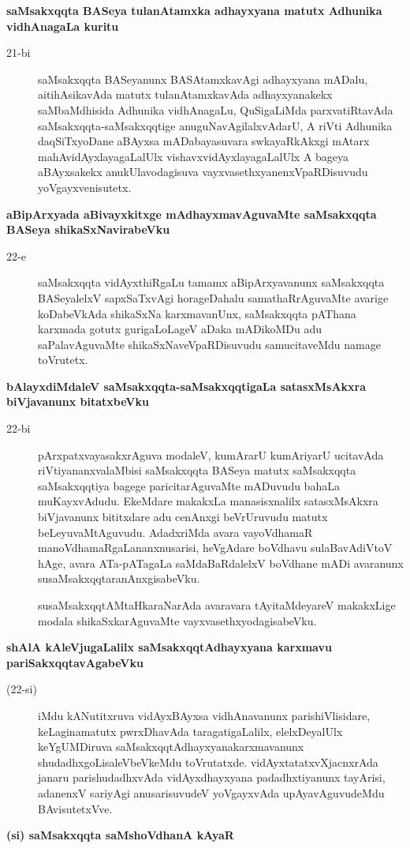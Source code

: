 {\bigskip
\noindent
{\large\bf saMsakxqqta BASeya tulanAtamxka adhayxyana matutx Adhunika vidhAnagaLa kuritu}}\label{page52}
\begin{description}
\item[21-bi] saMsakxqqta BASeyanunx BASAtamxkavAgi adhayxyana mADalu, aitihAsikavAda matutx tulanAtamxkavAda adhayxyanakekx saMbaMdhisida Adhunika vidhAnagaLu, QuSigaLiMda parxvatiRtavAda saMsakxqqta-saMsakxqqtige anuguNa\-vAgilalx\-vAdarU, A riVti Adhunika daqSiTx\-yoDane aBAyxsa mADa\-bayasu\-vara swkayaR\-kAkxgi mAtarx mahAvidAyxlayagaLalUlx vishavxvidAyxlayagaLalUlx A bageya aBAyx\-sakekx anu\-kUla\-voda\-gisuva vayxvasethxyanenxVpaRDisuvudu yoVgayxvenisutetx.
\end{description}
{\noindent
{\large\bf aBipArxyada aBivayxkitxge mAdhayxmavAguvaMte saMsakxqqta BASeya shikaSxNavirabeVku}}\label{page52a}
\begin{description}
\item[22-e] saMsakxqqta vidAyxthiRgaLu tamamx aBipArxyavanunx saMsakxqqta BASeyalelxV sapxSaTxvAgi hora\-geDa\-halu sama\-thaR\-rAgu\-vaMte avarige koDa\-beVkAda shikaSxNa karxma\-vanUnx, saMsakxqqta pAThana karxmada gotutx guri\-gaLo\-LageV aDaka mADi\-koMDu adu saPala\-vAgu\-vaMte shikaSxNa\-veVpaRDisu\-vudu samucita\-veMdu namage toVrutetx.
\end{description}
{\noindent
{\large\bf bAlayxdiMdaleV saMsakxqqta-saMsakxqqtigaLa satasxMsAkxra biVjavanunx bitatxbeVku}}\label{page53}
\begin{description}
\item[22-bi] pArxpatxvayasakxrAguva modaleV, kumArarU kumAriyarU ucitavAda riVti\-yananx\-va\-laMbisi saMsakxqqta BASeya matutx saMsakxqqta saMsakxqqtiya bagege paricitarAguvaMte mADuvudu bahaLa muKayxvAdudu. EkeMdare makakxLa manasisxnalilx satasxMsAkxra biVjavanunx bititxdare adu cenAnxgi beVrUru\-vudu matutx beLeyuvaMtAguvudu. AdadxriMda avara vayoVdhamaR manoV\-dhamaR\-gaLa\-nanxnu\-sarisi, heVgAdare boVdhavu sulaBavAdiVtoV hAge, avara ATa-pATagaLa saMdaBaRdalelxV boV\-dhane mADi avaranunx susaMsakxqqtaranAnxgisabeVku.

susaMsakxqqtAMtaHkaraNarAda avaravara tAyitaMdeyareV makakxLige modala shikaSxkarAguvaMte vayxva\-sethxyodagisabeVku.
\end{description}
{\noindent
{\large\bf shAlA kAleVjugaLalilx saMsakxqqtAdhayxyana karxmavu pariSakxqqtavAgabeVku}}\label{page53a}
\begin{description}
\item[(22-si)] iMdu kANutitxruva vidAyxBAyxsa vidhAnavanunx parishiVlisidare, keLagina\break matutx pwrxDhavAda taragati\-gaLalilx, elelxDeyalUlx keYgUMDiruva saMsakxqqtA\-dhayx\-yanakarxmavanunx shudadhxgoLisaleVbeVkeMdu toVrutatxde. vidAyxtatatxvXjacnxrAda janaru parishudadhxvAda vidAyxdhayxyana padadhxtiyanunx tayArisi,
adanenxV sari\-yAgi anusarisuvudeV yoVgayxvAda upAyavAguvudeMdu BAvisu\-tetxVve.
\end{description}
{\noindent
{\large\bf (si) saMsakxqqta saMshoVdhanA kAyaR}}\label{page53b}

